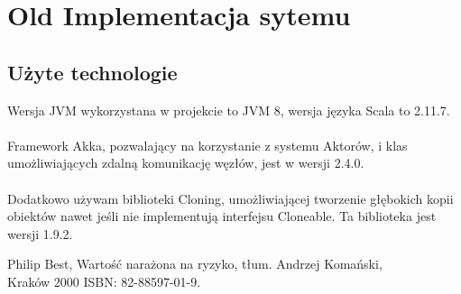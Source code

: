 \documentclass[11pt,titlepage]{article}
\numberwithin{equation}{section}
\begin{document}
\section{Old Implementacja sytemu}

\subsection{Użyte technologie}

Wersja JVM wykorzystana w projekcie to JVM 8, wersja języka Scala to 2.11.7. \\
\\
Framework Akka, pozwalający na korzystanie z systemu Aktorów, i klas umożliwiających zdalną komunikację węzłów, jest w wersji 2.4.0.\\
\\
Dodatkowo używam biblioteki Cloning, umożliwiającej tworzenie głębokich kopii obiektów nawet jeśli nie implementują interfejsu Cloneable. Ta biblioteka jest wersji 1.9.2.





\newpage



Philip Best, Wartość narażona na ryzyko, tłum. Andrzej Komański,
\\
Kraków 2000 ISBN: 82-88597-01-9.
\end{document}
